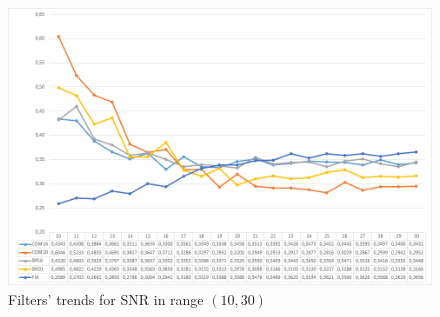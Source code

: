 \vfill
  \begin{figure}[t!]
    \centering
    \includegraphics[width=\textwidth]{./images/analysis/noise/prep2.png}
    \caption{Filters' trends for \acs{SNR} in range $\left( 10, 30 \right)$}
    \label{fig:prep2}
  \end{figure}
